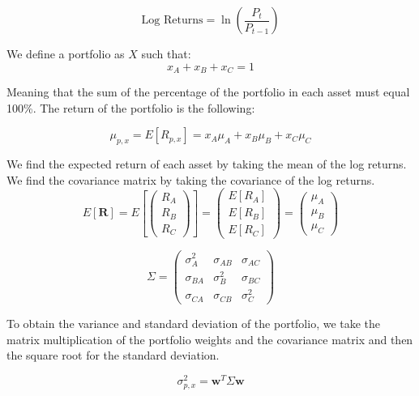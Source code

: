 \documentclass[journal,transmag]{IEEEtran}
\begin{document}
\begin{equation}
\text{Log Returns} = \ln\left(\frac{P_t}{P_{t-1}}\right)
\end{equation}

We define a portfolio as $X$ such that:
\begin{equation}
x_A + x_B + x_C = 1
\end{equation}

\noindent Meaning that the sum of the percentage of the portfolio in each asset must equal 100\%. The return of the portfolio is the following:

\begin{equation}
\mu_{p,x} = E[R_{p,x}] = x_A \mu_A + x_B \mu_B + x_C \mu_C
\end{equation}

\noindent We find the expected return of each asset by taking the mean of the log returns. We find the covariance matrix by taking the covariance of the log returns.
\begin{equation}
E[\mathbf{R}] = E \left[ \begin{pmatrix} R_A \\ R_B \\ R_C \end{pmatrix} \right] = \begin{pmatrix} E[R_A] \\ E[R_B] \\ E[R_C] \end{pmatrix} = \begin{pmatrix} \mu_A \\ \mu_B \\ \mu_C \end{pmatrix}
\end{equation}

\begin{equation}
\Sigma = \begin{pmatrix} \sigma_A^2 & \sigma_{AB} & \sigma_{AC} \\ \sigma_{BA} & \sigma_B^2 & \sigma_{BC} \\ \sigma_{CA} & \sigma_{CB} & \sigma_C^2 \end{pmatrix}
\end{equation}

\noindent To obtain the variance and standard deviation of the portfolio,
we take the matrix multiplication of the portfolio weights and the covariance matrix and then the square root for the standard deviation.

\begin{equation}
\sigma_{p,x}^2 = \mathbf{w}^T \Sigma \mathbf{w}
\end{equation}
\end{document}
